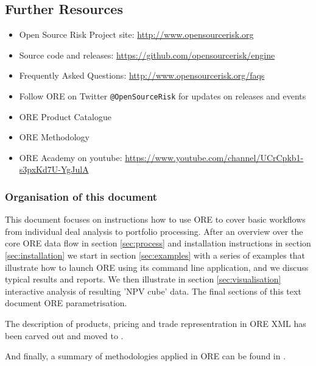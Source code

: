 \subsection{Further Resources}
\begin{itemize}
\item Open Source Risk Project site: \url{http://www.opensourcerisk.org}
\item Source code and releases: \url{https://github.com/opensourcerisk/engine}
\item Frequently Asked Questions: \url{http://www.opensourcerisk.org/faqs}
\item Follow ORE on Twitter {\tt @OpenSourceRisk} for updates on releases and events
\item ORE Product Catalogue \cite{products}
\item ORE Methodology \cite{methods}
\item ORE Academy on youtube: \url{https://www.youtube.com/channel/UCrCpkb1-s3pxKd7U-YgJulA}
\end{itemize}
 
\subsubsection*{Organisation of this document}

This document focuses on instructions how to use ORE to cover basic workflows from individual deal analysis to portfolio
processing. After an overview over the core ORE data flow in section \ref{sec:process} and installation instructions in
section \ref{sec:installation} we start in section \ref{sec:examples} with a series of examples that illustrate how to
launch ORE using its command line application, and we discuss typical results and reports. We then illustrate in section
\ref{sec:visualisation} interactive analysis of resulting 'NPV cube' data. The final sections of this text document ORE
parametrisation.

The description of products, pricing and trade representration in ORE XML has been carved out and moved to \cite{products}.

And finally, a summary of methodologies applied in ORE can be found in \cite{methods}.
